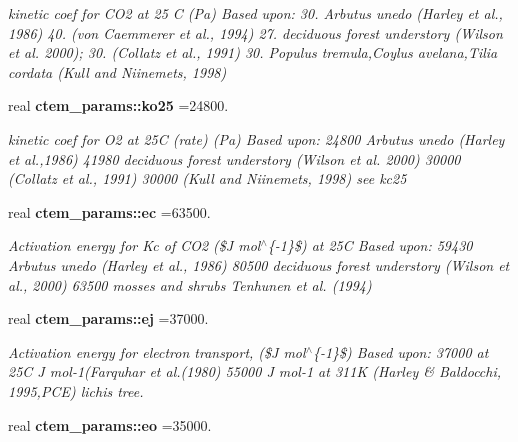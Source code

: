 \begin{DoxyCompactItemize}
\begin{DoxyCompactList}\small\item\em kinetic coef for C\+O2 at 25 C (Pa) Based upon\+: 30. Arbutus unedo (Harley et al., 1986) 40. (von Caemmerer et al., 1994) 27. deciduous forest understory (Wilson et al. 2000); 30. (Collatz et al., 1991) 30. Populus tremula,Coylus avelana,Tilia cordata (Kull and Niinemets, 1998) \end{DoxyCompactList}\item 
\hypertarget{namespacectem__params_aeb7cdce1fb150241fa26098d767fe9dd}{}real {\bfseries ctem\+\_\+params\+::ko25} =24800.\label{namespacectem__params_aeb7cdce1fb150241fa26098d767fe9dd}

\begin{DoxyCompactList}\small\item\em kinetic coef for O2 at 25\+C (rate) (Pa) Based upon\+: 24800 Arbutus unedo (Harley et al.,1986) 41980 deciduous forest understory (Wilson et al. 2000) 30000 (Collatz et al., 1991) 30000 (Kull and Niinemets, 1998) see kc25 \end{DoxyCompactList}\item 
\hypertarget{namespacectem__params_a28ee6d98bc1361ecb84e26e13942fe7d}{}real {\bfseries ctem\+\_\+params\+::ec} =63500.\label{namespacectem__params_a28ee6d98bc1361ecb84e26e13942fe7d}

\begin{DoxyCompactList}\small\item\em Activation energy for Kc of C\+O2 (\$\+J mol$^\wedge$\{-\/1\}\$) at 25\+C Based upon\+: 59430 Arbutus unedo (Harley et al., 1986) 80500 deciduous forest understory (Wilson et al., 2000) 63500 mosses and shrubs Tenhunen et al. (1994) \end{DoxyCompactList}\item 
\hypertarget{namespacectem__params_a5eb23f336fa9f9d97c402d5eb03ff3c7}{}real {\bfseries ctem\+\_\+params\+::ej} =37000.\label{namespacectem__params_a5eb23f336fa9f9d97c402d5eb03ff3c7}

\begin{DoxyCompactList}\small\item\em Activation energy for electron transport, (\$\+J mol$^\wedge$\{-\/1\}\$) Based upon\+: 37000 at 25\+C J mol-\/1(Farquhar et al.(1980) 55000 J mol-\/1 at 311\+K (Harley \& Baldocchi, 1995,P\+C\+E) lichis tree. \end{DoxyCompactList}\item 
\hypertarget{namespacectem__params_aaa562bfa9890e55635269514ceb4be0f}{}real {\bfseries ctem\+\_\+params\+::eo} =35000.\label{namespacectem__params_aaa562bfa9890e55635269514ceb4be0f}


\end{DoxyCompactItemize}
